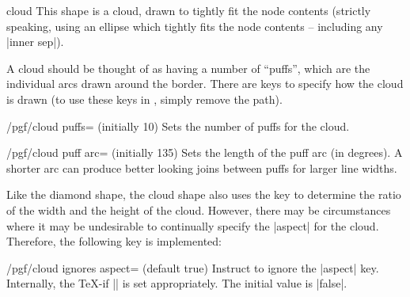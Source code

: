 \begin{shape}{cloud}
    This shape is a cloud, drawn to tightly fit the node contents (strictly
    speaking, using an ellipse which tightly fits the node contents --
    including any |inner sep|).
\begin{codeexample}[preamble={\usetikzlibrary{shapes.symbols}}]
\end{codeexample}

    A cloud should be thought of as having a number of ``puffs'', which are the
    individual arcs drawn around the border. There are \pgfname{} keys to
    specify how the cloud is drawn (to use these keys in \tikzname{}, simply
    remove the  path).

    \begin{key}{/pgf/cloud puffs= (initially 10)}
        Sets the number of puffs for the cloud.
    \end{key}

    \begin{key}{/pgf/cloud puff arc= (initially 135)}
        Sets the length of the puff arc (in degrees). A shorter arc can produce
        better looking joins between puffs for larger line widths.
    \end{key}

    Like the diamond shape, the cloud shape also uses the 
    key to determine the ratio of the width and the height of the cloud.
    However, there may be circumstances where it may be undesirable to
    continually specify the |aspect| for the cloud. Therefore, the following
    key is implemented:

    \begin{key}{/pgf/cloud ignores aspect= (default true)}
        Instruct \pgfname{} to ignore the |aspect| key. Internally, the \TeX-if
        |\ifpgfcloudignoresaspect| is set appropriately. The initial value is
        |false|.
\begin{codeexample}[preamble={\usetikzlibrary{shapes.symbols}}]
\end{codeexample}
    \end{key}


\end{shape}
